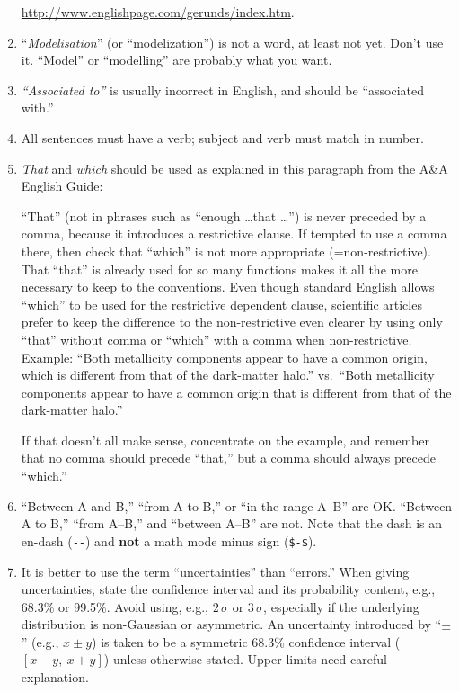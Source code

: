 \documentclass[letterpaper,11pt]{article}
\begin{document}
\begin{enumerate}
\url{http://www.englishpage.com/gerunds/index.htm}.

\item ``{\it Modelisation\/}'' (or ``modelization'') is not a word, at least not yet.  Don't use it.  ``Model'' or ``modelling'' are probably
what you want.

\item

{\it ``Associated to''\/} is usually incorrect in English, and should be
``associated with.''


\item All sentences must have a verb; subject and verb must match in number.

\item {\it That\/} and {\it which\/} should be used as explained in this paragraph from the A\&A English Guide:

``That'' (not in phrases such as ``enough \dots that \dots'') is never
preceded by a comma, because it introduces a restrictive clause.  If tempted
to use a comma there, then check that ``which'' is not more appropriate
(=non-restrictive).  That ``that'' is already used for so many functions makes
it all the more necessary to keep to the conventions.  Even though standard
English allows ``which'' to be used for the restrictive dependent clause,
scientific articles prefer to keep the difference to the non-restrictive even
clearer by using only ``that'' without comma or ``which'' with a comma when
non-restrictive.  Example: ``Both metallicity components appear to have a
common origin, which is different from that of the dark-matter halo.'' vs.\
``Both metallicity components appear to have a common origin that is different
from that of the dark-matter halo.''

If that doesn't all make sense, concentrate on the example, and remember that
no comma should precede ``that,'' but a comma should always precede ``which.''

\item ``Between A and B,'' ``from A to B,'' or ``in the range A--B'' are
\hbox{OK}.  ``Between A to B,'' ``from A--B,'' and ``between A--B'' are not.  Note that the dash is an en-dash (\verb|--|) and {\bf not} a math mode minus sign (\verb|$-$|).

\item It is better to use the term ``uncertainties'' than ``errors.''  When
giving uncertainties, state the confidence interval and its probability
content, e.g., 68.3\% or 99.5\%.  Avoid using, e.g., $2\,\sigma$ or $3\,\sigma$,
especially if the underlying distribution is non-Gaussian or asymmetric.  An
uncertainty introduced by ``$\pm$'' (e.g., $x\pm y$) is taken to be a
symmetric 68.3\% confidence interval ($[x-y,\ x+y]$) unless otherwise stated.
Upper limits need careful explanation. 


\end{enumerate}
\end{document}
